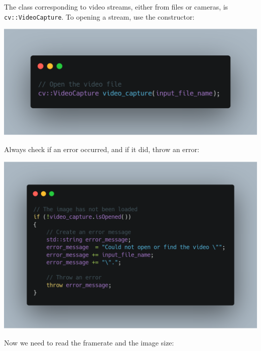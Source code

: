 \documentclass[english,a4paper,12pt,oneside]{article}
\begin{document}
The class corresponding to video streams, either from files or cameras, is \verb+cv::VideoCapture+. 
To opening a stream, use the constructor:

\includegraphics[width=\linewidth]{carbon(1)}

Always check if an error occurred, and if it did, throw an error:

% 
\includegraphics[width=\linewidth]{carbon(2)}

Now we need to read the framerate and the image size:
\end{document}
